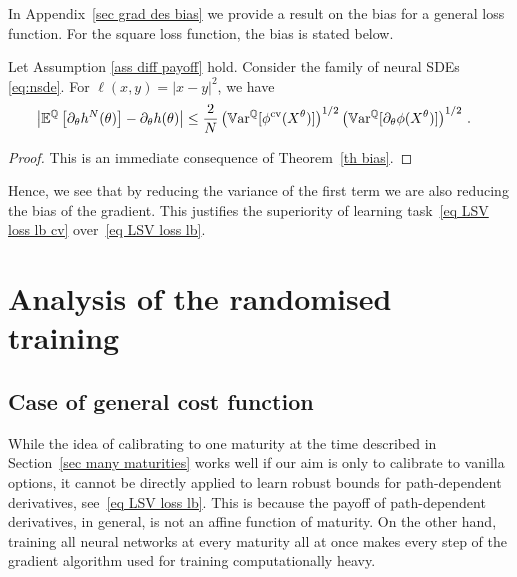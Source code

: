 In Appendix~\ref{sec grad des bias} we provide a result on the bias for a general loss function. 
For the square loss function, the bias is stated below. 

\begin{theorem}
\label{eq cor sq loss bias}
Let Assumption \ref{ass diff payoff} hold. Consider the family of neural SDEs \eqref{eq:nsde}. For $\ell(x,y)= |x - y|^{2}$, we have
\[
\begin{split}
 	&\left| \mathbb{E}^{\mathbb{Q}}\left[\partial_{\theta} h^{N}(\theta)\right] -  \partial_{\theta}h(\theta) \right|
 	  \leq  \frac{2}{N} \left(  \mathbb{V}\mathrm{ar}^{\mathbb{Q}}[\phi^{\textup{cv}}(X^{\theta})] \right)^{1/2} \left( \mathbb{V}\mathrm{ar}^{\mathbb{Q}}[\partial_{\theta}\phi(X^{\theta})]   \right)^{1/2}\,.
 \end{split}
\]
\end{theorem}
\begin{proof}
This is an immediate consequence of Theorem~\ref{th bias}.
\end{proof}


Hence, we see that by reducing the variance of the first term we are also reducing the bias of the gradient. This justifies the superiority of learning task~\eqref{eq LSV loss lb cv} over~\eqref{eq LSV loss lb}.


\section{Analysis of the randomised training}\label{sec random training}
\subsection{Case of general cost function}

While the idea of calibrating to one maturity at the time described in Section~\ref{sec many maturities} works well if our aim is only to calibrate to vanilla options, it cannot be directly applied to learn robust bounds for path-dependent derivatives, see~\eqref{eq LSV loss lb}. This is because the payoff of path-dependent derivatives, in general, is not an affine function of maturity. On the other hand, training all neural networks at every maturity all at once makes every step of the gradient algorithm used for training computationally heavy. 


